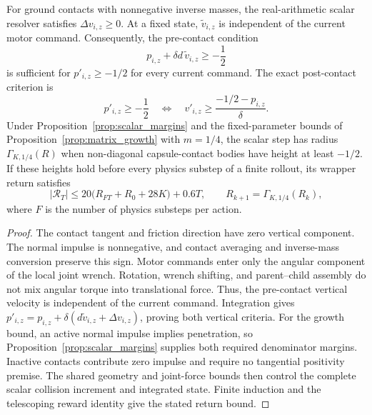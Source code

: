 \begin{proposition}
\label{prop:scalar_step}
For ground contacts with nonnegative inverse masses, the real-arithmetic scalar resolver satisfies $\Delta v_{i,z}\ge0$.
At a fixed state, $\widetilde v_{i,z}$ is independent of the current motor command.
Consequently, the pre-contact condition
\begin{equation}
 p_{i,z}+\delta d\,\widetilde v_{i,z}\ge-\frac12
 \label{eq:scalar_vertical_viability}
\end{equation}
is sufficient for $p'_{i,z}\ge-1/2$ for every current command.
The exact post-contact criterion is
\begin{equation}
 p'_{i,z}\ge-\frac12
 \quad\Longleftrightarrow\quad
 v'_{i,z}\ge\frac{-1/2-p_{i,z}}{\delta}.
\end{equation}
Under Proposition~\ref{prop:scalar_margins} and the fixed-parameter bounds of Proposition~\ref{prop:matrix_growth} with $m=1/4$, the scalar step has radius $\Gamma_{K,1/4}(R)$ when non-diagonal capsule-contact bodies have height at least $-1/2$.
If these heights hold before every physics substep of a finite rollout, its wrapper return satisfies
\begin{equation}
 |\mathcal R_T|\le
 20\bigl(R_{FT}+R_0+28K\bigr)+0.6T,
 \qquad R_{k+1}=\Gamma_{K,1/4}(R_k),
\end{equation}
where $F$ is the number of physics substeps per action.
\end{proposition}

\begin{proof}
The contact tangent and friction direction have zero vertical component.
The normal impulse is nonnegative, and contact averaging and inverse-mass conversion preserve this sign.
Motor commands enter only the angular component of the local joint wrench.
Rotation, wrench shifting, and parent--child assembly do not mix angular torque into translational force.
Thus, the pre-contact vertical velocity is independent of the current command.
Integration gives $p'_{i,z}=p_{i,z}+\delta(d\widetilde v_{i,z}+\Delta v_{i,z})$, proving both vertical criteria.
For the growth bound, an active normal impulse implies penetration, so Proposition~\ref{prop:scalar_margins} supplies both required denominator margins.
Inactive contacts contribute zero impulse and require no tangential positivity premise.
The shared geometry and joint-force bounds then control the complete scalar collision increment and integrated state.
Finite induction and the telescoping reward identity give the stated return bound.
\end{proof}

